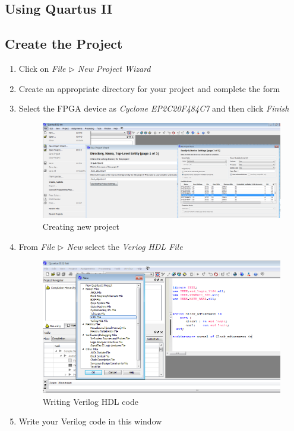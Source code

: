 \documentclass[12pt, logo=tehranDLDL/ut]{tehranDLDL}
\begin{document}
\begin{appendices}
\section{Using Quartus II}

\subsection{Create the Project}

\begin{enumerate}
    \item Click on \textit{File $\rhd$ New Project Wizard}
    \item Create an appropriate directory for your project and complete the form
    \item Select the FPGA device as \textit{Cyclone EP2C20F484C7} and then click \textit{Finish}
    \begin{figure}[b]
        \centering
        \caption{Creating new project\label{fig:new_proj}}
        \includegraphics[width=\textwidth]{new_proj.png}
    \end{figure}
    \item From \textit{File $\rhd$ New} select the \textit{Veriog HDL File}
    \begin{figure}
        \centering
        \caption{Writing Verilog HDL code\label{fig:verilog}}
        \includegraphics[width=\textwidth]{verilog.png}
    \end{figure}
    \item Write your Verilog code in this window
\end{enumerate}


\end{appendices}
\end{document}
